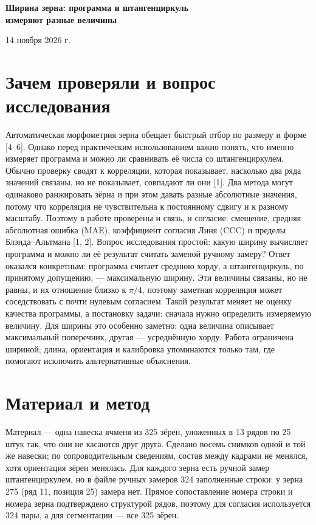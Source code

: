 \documentclass[12pt,a4paper]{article}
\begin{document}
\begin{center}
{\Large\bfseries Ширина зерна: программа и штангенциркуль\\
измеряют разные величины\par}
\vspace{0.6em}
{\normalsize 14 ноября 2026 г.\par}
\end{center}

\section{Зачем проверяли и вопрос исследования}

Автоматическая морфометрия зерна обещает быстрый отбор по размеру и форме
[4--6]. Однако перед практическим использованием важно понять, что именно
измеряет программа и можно ли сравнивать её числа со штангенциркулем.
Обычно проверку сводят к корреляции, которая показывает, насколько два
ряда значений связаны, но не показывает, совпадают ли они [1]. Два метода
могут одинаково ранжировать зёрна и при этом давать разные абсолютные
значения, потому что корреляция не чувствительна к постоянному сдвигу и к
разному масштабу. Поэтому в работе проверены и связь, и согласие: смещение,
средняя абсолютная ошибка (MAE), коэффициент согласия Линя (CCC) и пределы
Блэнда--Альтмана [1, 2]. Вопрос исследования простой: какую ширину
вычисляет программа и можно ли её результат считать заменой ручному
замеру? Ответ оказался конкретным: программа считает среднюю хорду, а
штангенциркуль, по принятому допущению, --- максимальную ширину. Эти
величины связаны, но не равны, и их отношение близко к $\pi/4$, поэтому
заметная корреляция может соседствовать с почти нулевым согласием. Такой
результат меняет не оценку качества программы, а постановку задачи: сначала
нужно определить измеряемую величину. Для ширины это особенно заметно: одна
величина описывает максимальный поперечник, другая --- усреднённую хорду.
Работа ограничена шириной; длина, ориентация и калибровка упоминаются
только там, где помогают исключить альтернативные объяснения.

\section{Материал и метод}

Материал --- одна навеска ячменя из 325 зёрен, уложенных в 13 рядов по
25 штук так, что они не касаются друг друга. Сделано восемь снимков одной и
той же навески; по сопроводительным сведениям, состав между кадрами не
менялся, хотя ориентация зёрен менялась. Для каждого зерна есть ручной
замер штангенциркулем, но в файле ручных замеров 324 заполненные строки:
у зерна 275 (ряд 11, позиция 25) замера нет. Прямое сопоставление номера строки и номера
зерна подтверждено структурой рядов, поэтому для согласия используется
324 пары, а для сегментации --- все 325 зёрен.
\end{document}
